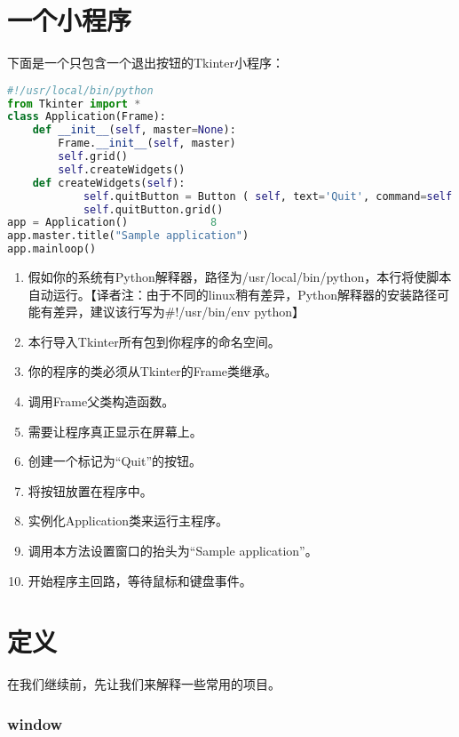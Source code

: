 \documentclass[11pt,a4paper,oneside]{book}
\begin{document}
\chapter[一个小程序]{一个小程序}%
下面是一个只包含一个退出按钮的Tkinter小程序：
\begin{lstlisting}[language=python]
#!/usr/local/bin/python                      
from Tkinter import * 			     
class Application(Frame): 			
	def __init__(self, master=None):     
		Frame.__init__(self, master) 
		self.grid() 		     	
		self.createWidgets() 
	def createWidgets(self): 
			self.quitButton = Button ( self, text='Quit', command=self.quit ) 	
			self.quitButton.grid()  
app = Application() 			8			
app.master.title("Sample application") 	
app.mainloop()                         
\end{lstlisting}
\begin{enumerate}
\item 假如你的系统有Python解释器，路径为/usr/local/bin/python，本行将使脚本自动运行。【译者注：由于不同的linux稍有差异，Python解释器的安装路径可能有差异，建议该行写为\#!/usr/bin/env python】
\item 本行导入Tkinter所有包到你程序的命名空间。
\item 你的程序的类必须从Tkinter的Frame类继承。
\item 调用Frame父类构造函数。
\item 需要让程序真正显示在屏幕上。
\item 创建一个标记为“Quit”的按钮。
\item 将按钮放置在程序中。
\item 实例化Application类来运行主程序。
\item 调用本方法设置窗口的抬头为“Sample application”。
\item 开始程序主回路，等待鼠标和键盘事件。
\end{enumerate}
\chapter[定义]{定义}%
在我们继续前，先让我们来解释一些常用的项目。
\subsection*{\textbf{window}}
\end{document}

